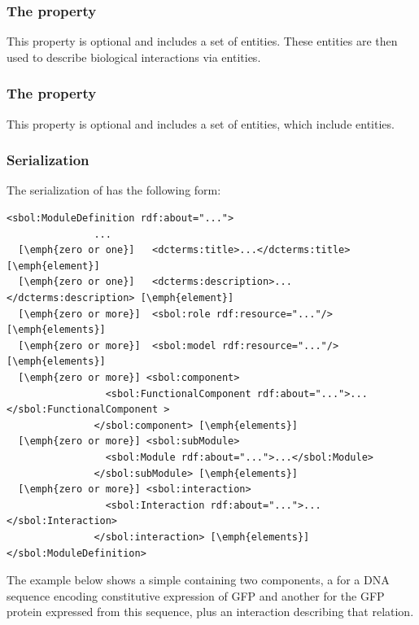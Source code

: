 \subsubsection*{The  property}
This property is optional and includes a set of  entities. These entities are then used to describe biological interactions via  entities.


\subsubsection*{The  property}
This property is optional and includes a set of  entities, which include  entities.

\subsubsection*{Serialization}

The serialization of  has the following form:
\begin{lstlisting}
<sbol:ModuleDefinition rdf:about="...">
               ...
  [\emph{zero or one}]   <dcterms:title>...</dcterms:title> [\emph{element}]
  [\emph{zero or one}]   <dcterms:description>...</dcterms:description> [\emph{element}]
  [\emph{zero or more}]  <sbol:role rdf:resource="..."/> [\emph{elements}]
  [\emph{zero or more}]  <sbol:model rdf:resource="..."/> [\emph{elements}]
  [\emph{zero or more}] <sbol:component>
                 <sbol:FunctionalComponent rdf:about="...">...</sbol:FunctionalComponent >
               </sbol:component> [\emph{elements}]
  [\emph{zero or more}] <sbol:subModule>
                 <sbol:Module rdf:about="...">...</sbol:Module>
               </sbol:subModule> [\emph{elements}]
  [\emph{zero or more}] <sbol:interaction>
                 <sbol:Interaction rdf:about="...">...</sbol:Interaction>
               </sbol:interaction> [\emph{elements}]
</sbol:ModuleDefinition>
\end{lstlisting}


The example below shows a simple  containing two components, a  for a DNA sequence encoding constitutive expression of GFP and another for the GFP protein expressed from this sequence, plus an interaction describing that relation.

